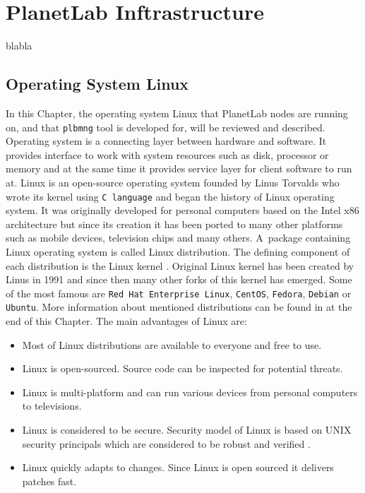 \section{PlanetLab Inftrastructure}
\label{section:plinfra}

blabla

\subsection{Operating System Linux}
\label{subsection:Linux}
In this Chapter, the operating system Linux that PlanetLab nodes are running on, and that \texttt{plbmng} tool is developed for, will be reviewed and described. Operating system is a connecting layer between hardware and software. It provides interface to work with system resources such as disk, processor or memory and at the same time it provides service layer for client software to run at. Linux is an open-source operating system founded by Linus Torvalds who wrote its kernel using \texttt{C language} and began the history of Linux operating system. It was originally developed for personal computers based on the Intel x86 architecture but since its creation it has been ported to many other platforms such as mobile devices, television chips and many others. A~package containing Linux operating system is called Linux distribution. The defining component of each distribution is the Linux kernel \cite{eckert2012linux+}. Original Linux kernel has been created by Linus in 1991 \cite{linuxintro} and since then many other forks of this kernel has emerged. Some of the most famous are \texttt{Red Hat Enterprise Linux},  \texttt{CentOS}, \texttt{Fedora}, \texttt{Debian} or \texttt{Ubuntu}. More information about mentioned distributions can be found in at the end of this Chapter. The main advantages of Linux are:
\begin{itemize}
	\item Most of Linux distributions are available to everyone and free to use.
	\item Linux is open-sourced. Source code can be inspected for potential threats.
	\item Linux is multi-platform and can run various devices from personal computers to televisions.
	\item Linux is considered to be secure. Security model of Linux is based on UNIX security principals which are considered to be robust and verified \cite{BILHEQP2xqVnjbQi}. 
	\item Linux quickly adapts to changes. Since Linux is open sourced it delivers patches fast.
\end{itemize}
